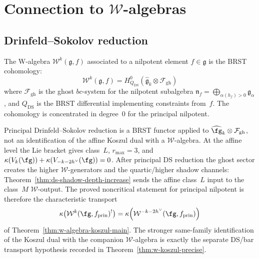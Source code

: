 \section{Connection to $\mathcal{W}$-algebras}

\subsection{Drinfeld--Sokolov reduction}

\begin{definition}
The W-algebra $\mathcal{W}^k(\mathfrak{g}, f)$ associated to a nilpotent element $f \in \mathfrak{g}$ is the BRST cohomology:
\begin{equation}
\mathcal{W}^k(\mathfrak{g}, f) = H^0_{Q_{\mathrm{DS}}}(\widehat{\mathfrak{g}}_k \otimes \mathcal{F}_{\mathrm{gh}})
\end{equation}
where $\mathcal{F}_{\mathrm{gh}}$ is the ghost $bc$-system for the nilpotent subalgebra $\mathfrak{n}_f = \bigoplus_{\alpha(h_f)>0} \mathfrak{g}_\alpha$, and $Q_{\mathrm{DS}}$ is the BRST differential implementing constraints from~$f$. The cohomology is concentrated in degree~$0$ for the principal nilpotent.
\end{definition}

\begin{remark}
\label{rem:ds-changes-shadow-problem}
Principal Drinfeld--Sokolov reduction is a BRST functor applied to
\(\widehat{\fg}_k\otimes\mathcal F_{\mathrm{gh}}\), not an
identification of the affine Koszul dual with a
\(\mathcal W\)-algebra.  At the affine level the Lie bracket gives
class~\(L\), \(r_{\max}=3\), and
\(\kappa(V_k(\fg))+\kappa(V_{-k-2h^\vee}(\fg))=0\).  After
principal DS reduction the ghost sector creates the higher
\(\mathcal W\)-generators and the quartic/higher shadow channels:
Theorem~\ref{thm:ds-shadow-depth-increase} sends the affine
class~\(L\) input to the class~\(M\) \(\mathcal W\)-output.  The
proved noncritical statement for principal nilpotent is therefore the
characteristic transport
\[
\kappa\!\left(\mathcal W^k(\fg,f_{\mathrm{prin}})^!\right)
=
\kappa\!\left(\mathcal W^{-k-2h^\vee}
(\fg,f_{\mathrm{prin}})\right)
\]
of Theorem~\ref{thm:w-algebra-koszul-main}.  The stronger
same-family identification of the Koszul dual with the companion
\(\mathcal W\)-algebra is exactly the separate DS/bar transport
hypothesis recorded in Theorem~\ref{thm:w-koszul-precise}.
\end{remark}

